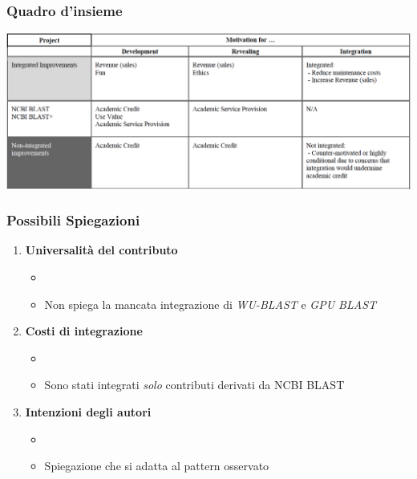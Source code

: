 \begin{frame}\frametitle{Quadro d'insieme}

\begin{center}
    \includegraphics[width=\textwidth,scale=.3]{img/quadro_insieme}
\end{center}


\end{frame}

\begin{frame}\frametitle{Possibili Spiegazioni}

\begin{enumerate}[<+->]
\def\labelenumi{\arabic{enumi}.}
\itemsep1pt\parskip0pt
\item
  \textbf{Universalità del contributo}

  \begin{itemize}[<+->]
  \itemsep1pt\parskip0pt
  \item
  \item
    Non spiega la mancata integrazione di \emph{WU-BLAST} e \emph{GPU
    BLAST}
  \end{itemize}
\item
  \textbf{Costi di integrazione}

  \begin{itemize}[<+->]
  \itemsep1pt\parskip0pt
  \item
  \item
    Sono stati integrati \emph{solo} contributi derivati da NCBI BLAST
  \end{itemize}
\item
  \textbf{Intenzioni degli autori}

  \begin{itemize}[<+->]
  \itemsep1pt\parskip0pt
  \item
  \item
    Spiegazione che si adatta al pattern osservato
  \end{itemize}
\end{enumerate}

\end{frame}

